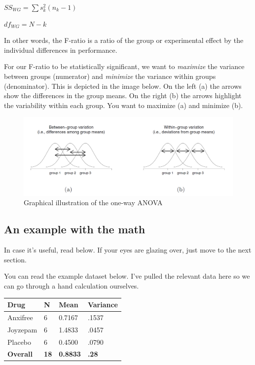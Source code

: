 \documentclass[
]{book}
\begin{document}
\(SS_{WG} = \sum{s_k^2}(n_k - 1)\)

\(df_{WG} = N - k\)

In other words, the F-ratio is a ratio of the group or experimental effect by the individual differences in performance.

For our F-ratio to be statistically significant, we want to \emph{maximize} the variance between groups (numerator) and \emph{minimize} the variance within groups (denominator). This is depicted in the image below. On the left (a) the arrows show the differences in the group means. On the right (b) the arrows highlight the variability within each group. You want to maximize (a) and minimize (b).

\begin{figure}

{\centering \includegraphics[width=0.8\linewidth]{images/04_one-way-anova/anova graphic} 

}

\caption{Graphical illustration of the one-way ANOVA}\label{fig:unnamed-chunk-1}
\end{figure}

\hypertarget{an-example-with-the-math}{%
\subsection{An example with the math}\label{an-example-with-the-math}}

In case it's useful, read below. If your eyes are glazing over, just move to the next section.

You can read the example dataset below. I've pulled the relevant data here so we can go through a hand calculation ourselves.

\begin{longtable}[]{@{}llll@{}}
\toprule
Drug & N & Mean & Variance\tabularnewline
\midrule
\endhead
Anxifree & 6 & 0.7167 & .1537\tabularnewline
Joyzepam & 6 & 1.4833 & .0457\tabularnewline
Placebo & 6 & 0.4500 & .0790\tabularnewline
\textbf{Overall} & \textbf{18} & \textbf{0.8833} & \textbf{.28}\tabularnewline
\bottomrule
\end{longtable}
\end{document}
